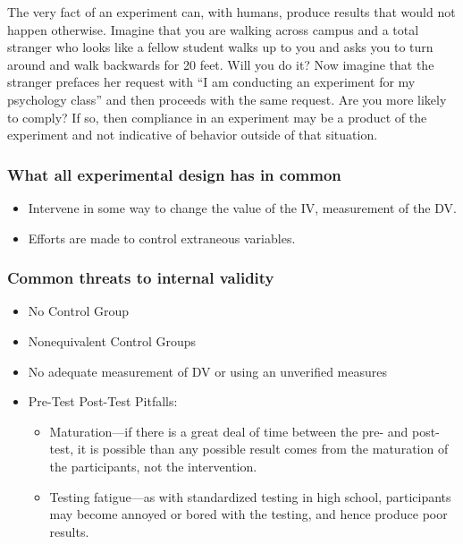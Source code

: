 \begin{refsection}
The very fact of an experiment can, with humans, produce results that would not happen otherwise. Imagine that you are walking across campus and a total stranger who looks like a fellow student walks up to you and asks you to turn around and walk backwards for 20 feet. Will you do it? Now imagine that the stranger prefaces her request with ``I am conducting an experiment for my psychology class'' and then proceeds with the same request. Are you more likely to comply? If so, then compliance in an experiment may be a product of the experiment and not indicative of behavior outside of that situation.

\subsubsection{What all experimental design has in common}
\label{whatallexperimentaldesignhasincommon}

\begin{itemize}
\item Intervene in some way to change the value of the IV, measurement of the DV.

\item Efforts are made to control extraneous variables.

\end{itemize}

\subsubsection{Common threats to internal validity}
\label{commonthreatstointernalvalidity}

\begin{itemize}
\item No Control Group

\item Nonequivalent Control Groups

\item No adequate measurement of DV or using an unverified measures

\item Pre-Test Post-Test Pitfalls:

\begin{itemize}
\item Maturation---if there is a great deal of time between the pre- and post-test, it is possible than any possible result comes from the maturation of the participants, not the intervention.

\item Testing fatigue---as with standardized testing in high school, participants may become annoyed or bored with the testing, and hence produce poor results.


\end{itemize}
\end{itemize}
\end{refsection}
